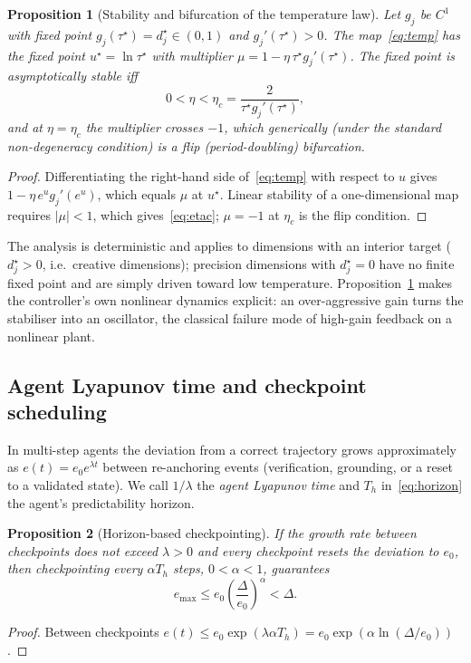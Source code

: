 \documentclass[preprint,12pt]{elsarticle}
\newtheorem{proposition}{Proposition}
\begin{document}
\begin{proposition}[Stability and bifurcation of the temperature law]
\label{prop:temp}
Let $g_j$ be $C^1$ with fixed point $g_j(\tau^\star)=d^\star_j\in(0,1)$ and $g_j'(\tau^\star)>0$. The map~\eqref{eq:temp} has the fixed point $u^\star=\ln\tau^\star$ with multiplier $\mu=1-\eta\,\tau^\star g_j'(\tau^\star)$. The fixed point is asymptotically stable iff
\begin{equation}
0<\eta<\eta_c=\frac{2}{\tau^\star g_j'(\tau^\star)},
\label{eq:etac}
\end{equation}
and at $\eta=\eta_c$ the multiplier crosses $-1$, which generically (under the standard non-degeneracy condition) is a flip (period-doubling) bifurcation.
\end{proposition}
\begin{proof}
Differentiating the right-hand side of~\eqref{eq:temp} with respect to $u$ gives $1-\eta\,e^{u}g_j'(e^{u})$, which equals $\mu$ at $u^\star$. Linear stability of a one-dimensional map requires $|\mu|<1$, which gives~\eqref{eq:etac}; $\mu=-1$ at $\eta_c$ is the flip condition.
\end{proof}
The analysis is deterministic and applies to dimensions with an interior target ($d_j^\star>0$, i.e.\ creative dimensions); precision dimensions with $d_j^\star=0$ have no finite fixed point and are simply driven toward low temperature. Proposition~\ref{prop:temp} makes the controller's own nonlinear dynamics explicit: an over-aggressive gain turns the stabiliser into an oscillator, the classical failure mode of high-gain feedback on a nonlinear plant.

\subsection{Agent Lyapunov time and checkpoint scheduling}
In multi-step agents the deviation from a correct trajectory grows approximately as $e(t)=e_0e^{\lambda t}$ between re-anchoring events (verification, grounding, or a reset to a validated state). We call $1/\lambda$ the \emph{agent Lyapunov time} and $T_h$ in~\eqref{eq:horizon} the agent's predictability horizon.

\begin{proposition}[Horizon-based checkpointing]
\label{prop:horizon}
If the growth rate between checkpoints does not exceed $\lambda>0$ and every checkpoint resets the deviation to $e_0$, then checkpointing every $\alpha T_h$ steps, $0<\alpha<1$, guarantees
\begin{equation}
e_{\max}\le e_0\left(\frac{\Delta}{e_0}\right)^{\alpha}<\Delta .
\label{eq:emax}
\end{equation}
\end{proposition}
\begin{proof}
Between checkpoints $e(t)\le e_0\exp(\lambda\alpha T_h)=e_0\exp(\alpha\ln(\Delta/e_0))$.
\end{proof}
\end{document}
